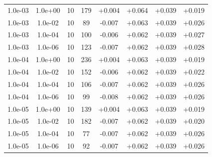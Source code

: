 \documentclass[11pt,a4paper]{article}
\begin{document}
\begin{table}
{\begin{tabular}{*{8}c}
 1.0e-03 	 & 1.0e+00 	 & 10 & 179 	 & +0.004 & +0.064 & +0.039 & +0.019 \\ 
 1.0e-03 	 & 1.0e-02 	 & 10 & 89 	 & -0.007 & +0.063 & +0.039 & +0.026 \\ 
 1.0e-03 	 & 1.0e-04 	 & 10 & 100 	 & -0.006 & +0.062 & +0.039 & +0.027 \\ 
 1.0e-03 	 & 1.0e-06 	 & 10 & 123 	 & -0.007 & +0.062 & +0.039 & +0.028 \\ 


 1.0e-04 	 & 1.0e+00 	 & 10 & 236 	 & +0.004 & +0.063 & +0.039 & +0.019 \\ 
 1.0e-04 	 & 1.0e-02 	 & 10 & 152 	 & -0.006 & +0.062 & +0.039 & +0.022 \\ 
 1.0e-04 	 & 1.0e-04 	 & 10 & 106 	 & -0.007 & +0.062 & +0.039 & +0.026 \\ 
 1.0e-04 	 & 1.0e-06 	 & 10 & 99 	 & -0.008 & +0.062 & +0.039 & +0.026 \\
 
 1.0e-05 	 & 1.0e+00 	 & 10 & 139 	 & +0.004 & +0.063 & +0.039 & +0.019 \\ 
 1.0e-05 	 & 1.0e-02 	 & 10 & 182 	 & -0.007 & +0.062 & +0.039 & +0.020 \\ 
 1.0e-05 	 & 1.0e-04 	 & 10 & 77 	 & -0.007 & +0.062 & +0.039 & +0.026 \\ 
 1.0e-05 	 & 1.0e-06 	 & 10 & 92 	 & -0.007 & +0.062 & +0.039 & +0.026 \\ 


\end{tabular}}
\end{table}
\end{document}
